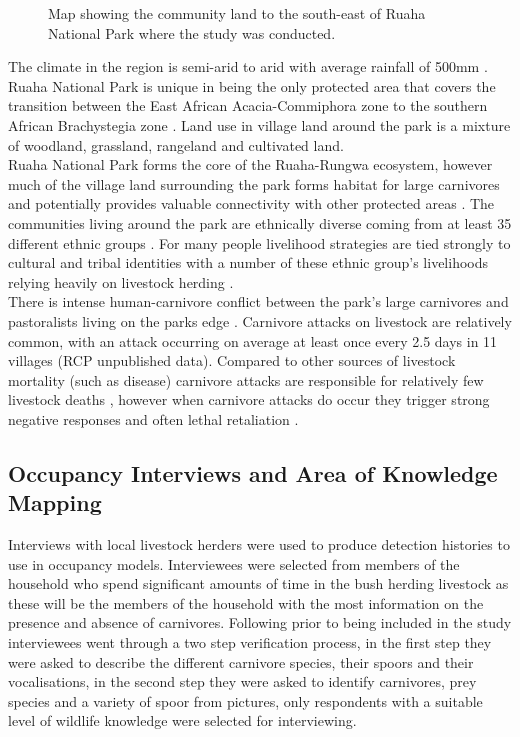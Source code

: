 \begin{figure}[htb]
\centering
\setlength\fboxsep{0pt}
\setlength\fboxrule{0.5pt}
\caption{Map showing the community land to the south-east of Ruaha National Park where the study was conducted.}
\label{fig:area_map}
\end{figure}

The climate in the region is semi-arid to arid with average rainfall of 500mm \cite{dickman2008}. Ruaha National Park is unique in being the only protected area that covers the transition between the East African Acacia-Commiphora zone to the southern African Brachystegia zone \cite{Barnes_1982}. Land use in village land around the park is a mixture of woodland, grassland, rangeland and cultivated land.\\

Ruaha National Park forms the core of the Ruaha-Rungwa ecosystem, however much of the village land surrounding the park forms habitat for large carnivores and potentially provides valuable connectivity with other protected areas \cite{Abade2014a}. The communities living around the park are ethnically diverse coming from at least 35 different ethnic groups \cite{williams2007people}. For many people livelihood strategies are tied strongly to cultural and tribal identities \cite{williams2007people,dickman2008} with a number of these ethnic group's livelihoods relying heavily on livestock herding \cite{dickman2008}.\\

There is intense human-carnivore conflict between the park's large carnivores and pastoralists living on the parks edge \cite{dickman2008}. Carnivore attacks on livestock are relatively common, with an attack occurring on average at least once every 2.5 days in 11 villages (RCP unpublished data). Compared to other sources of livestock mortality (such as disease) carnivore attacks are responsible for relatively few livestock deaths \cite{Dickman_2014}, however when carnivore attacks do occur they trigger strong negative responses and often lethal retaliation \cite{Abade2014,Dickman2008}. 

\subsection{Occupancy Interviews and Area of Knowledge Mapping}

Interviews with local livestock herders were used to produce detection histories to use in occupancy models. Interviewees were selected from members of the household who spend significant amounts of time in the bush herding livestock as these will be the members of the household with the most information on the presence and absence of carnivores. Following \citet{Zeller_2011} prior to being included in the study interviewees went through a two step verification process, in the first step they were asked to describe the different carnivore species, their spoors and their vocalisations, in the second step they were asked to identify carnivores, prey species and a variety of spoor from pictures, only respondents with a suitable level of wildlife knowledge were selected for interviewing.\\

